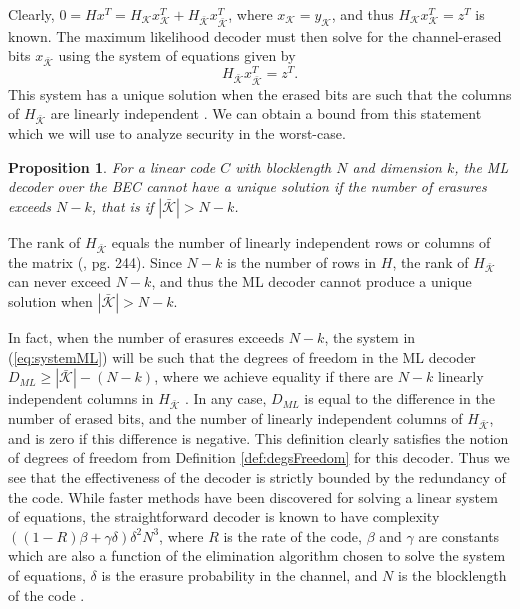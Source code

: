 \documentclass[10pt,twocolumn,twoside]{IEEEtran} \newlength{\pic}
\newtheorem{proposition}{Proposition}
\theoremstyle{definition}
\theoremstyle{remark}
\theoremstyle{plain}
\begin{document}
Clearly, $0 = Hx^T = H_{\mathcal{K}}x_{\mathcal{K}}^T + H_{\bar{\mathcal{K}}}x_{\bar{\mathcal{K}}}^T$, where $x_{\mathcal{K}} = y_{\mathcal{K}}$, and thus $H_{\mathcal{K}}x_{\mathcal{K}}^T = z^T$ is known. The maximum likelihood decoder must then solve for the channel-erased bits $x_{\bar{\mathcal{K}}}$ using the system of equations given by
\begin{equation}\label{eq:systemML}
  H_{\bar{\mathcal{K}}}x_{\bar{\mathcal{K}}}^T = z^T.
\end{equation}
This system has a unique solution when the erased bits are such that the columns of $H_{\bar{\mathcal{K}}}$ are linearly independent \cite{Urbanke01}. We can obtain a bound from this statement which we will use to analyze security in the worst-case.
\begin{proposition}\label{prop:boundOnSizeKbar}
For a linear code $C$ with blocklength $N$ and dimension $k$, the ML decoder over the BEC cannot have a unique solution if the number of erasures exceeds $N - k$, that is if $|\bar{\mathcal{K}}| > N - k$.
\end{proposition}
\begin{IEEEproof}
The rank of $H_{\bar{\mathcal{K}}}$ equals the number of linearly independent rows or columns of the matrix (\cite{MoonBlack}, pg. 244). Since $N - k$ is the number of rows in $H$, the rank of $H_{\bar{\mathcal{K}}}$ can never exceed $N - k$, and thus the ML decoder cannot produce a unique solution when $|\bar{\mathcal{K}}| > N - k$.
\end{IEEEproof}
In fact, when the number of erasures exceeds $N - k$, the system in (\ref{eq:systemML}) will be such that the degrees of freedom in the ML decoder $D_{ML} \geq |\bar{\mathcal{K}}| - (N - k)$, where we achieve equality if there are $N - k$ linearly independent columns in $H_{\bar{\mathcal{K}}}$ \cite{Burshtein04}. In any case, $D_{ML}$ is equal to the difference in the number of erased bits, and the number of linearly independent columns of $H_{\bar{\mathcal{K}}}$, and is zero if this difference is negative. This definition clearly satisfies the notion of degrees of freedom from Definition \ref{def:degsFreedom} for this decoder. Thus we see that the effectiveness of the decoder is strictly bounded by the redundancy of the code. While faster methods have been discovered for solving a linear system of equations, the straightforward decoder is known to have complexity $((1-R)\beta+\gamma \delta)\delta^2N^3$, where $R$ is the rate of the code, $\beta$ and $\gamma$ are constants which are also a function of the elimination algorithm chosen to solve the system of equations, $\delta$ is the erasure probability in the channel, and $N$ is the blocklength of the code \cite{Burshtein04}.
\end{document}
